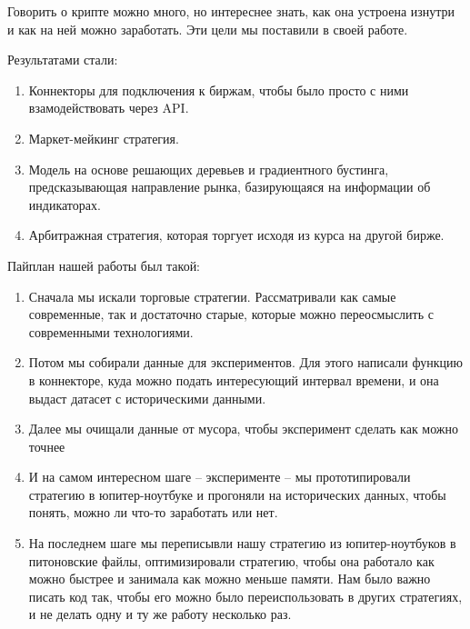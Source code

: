 Говорить о крипте можно много, но интереснее знать, как она устроена изнутри и как на ней можно заработать. Эти цели мы поставили в своей работе.


Результатами стали:

\begin{enumerate}

\item Коннекторы для подключения к биржам, чтобы было просто с ними взамодействовать через API.

\item Маркет-мейкинг стратегия.

\item Модель на основе решающих деревьев и градиентного бустинга, предсказывающая направление рынка, базирующаяся на информации об индикаторах.

\item Арбитражная стратегия, которая торгует исходя из курса на другой бирже.

\end{enumerate}


Пайплан нашей работы был такой:

\begin{enumerate}
\item Сначала мы искали торговые стратегии. Рассматривали как самые современные, так и достаточно старые, которые можно переосмыслить с современными технологиями.
\item Потом мы собирали данные для экспериментов. Для этого написали функцию в коннекторе, куда можно подать интересующий интервал времени, и она выдаст датасет с историческими данными.
\item Далее мы очищали данные от мусора, чтобы эксперимент сделать как можно точнее
\item И на самом интересном шаге -- эксперименте -- мы прототипировали стратегию в юпитер-ноутбуке и прогоняли на исторических данных, чтобы понять, можно ли что-то заработать или нет.
\item На последнем шаге мы переписывли нашу стратегию из юпитер-ноутбуков в питоновские файлы, оптимизировали стратегию, чтобы она работало как можно быстрее и занимала как можно меньше памяти. Нам было важно писать код так, чтобы его можно было переиспользовать в других стратегиях, и не делать одну и ту же работу несколько раз.
\end{enumerate}

